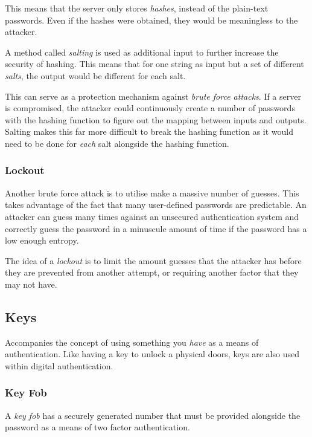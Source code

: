 \documentclass{article}
\begin{document}
This means that the server only stores \textit{hashes}, instead of the plain-text passwords. Even if the hashes were obtained, they would be meaningless to the attacker.

A method called \textit{salting} is used as additional input to further increase the security of hashing. This means that for one string as input but a set of different \textit{salts}, the output would be different for each salt.

This can serve as a protection mechanism against \textit{brute force attacks}. If a server is compromised, the attacker could continuously create a number of passwords with the hashing function to figure out the mapping between inputs and outputs. Salting makes this far more difficult to break the hashing function as it would need to be done for \textit{each} salt alongside the hashing function.

\subsubsection{Lockout}

Another brute force attack is to utilise make a massive number of guesses. This takes advantage of the fact that many user-defined passwords are predictable. An attacker can guess many times against an unsecured authentication system and correctly guess the password in a minuscule amount of time if the password has a low enough entropy.

The idea of a \textit{lockout} is to limit the amount guesses that the attacker has before they are prevented from another attempt, or requiring another factor that they may not have.

\subsection{Keys}

Accompanies the concept of using something you \textit{have} as a means of authentication. Like having a key to unlock a physical doors, keys are also used within digital authentication.

\subsubsection{Key Fob}

A \textit{key fob} has a securely generated number that must be provided alongside the password as a means of two factor authentication.
\end{document}
